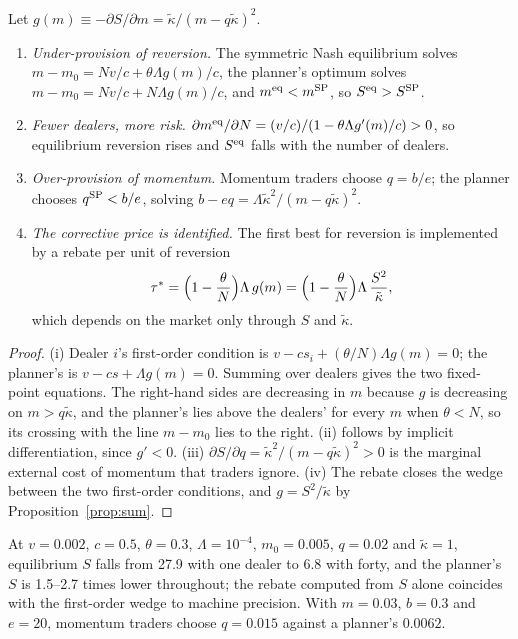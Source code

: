 \begin{proposition}\label{prop:equil}
Let $g(m)\equiv-\partial S/\partial m=\tilde\kappa/(m-q\tilde\kappa)^2$.
\begin{enumerate}[label=(\roman*)]
\item \emph{Under-provision of reversion.} The symmetric Nash equilibrium solves $m-m_0=N v/c+\theta\Lambda g(m)/c$, the planner's optimum solves $m-m_0=N v/c+N\Lambda g(m)/c$, and $m^{\rm eq}<m^{\rm SP}$, so $S^{\rm eq}>S^{\rm SP}$.
\item \emph{Fewer dealers, more risk.} $\partial m^{\rm eq}/\partial N=(v/c)/(1-\theta\Lambda g'(m)/c)>0$, so equilibrium reversion rises and $S^{\rm eq}$ falls with the number of dealers.
\item \emph{Over-provision of momentum.} Momentum traders choose $q=b/e$; the planner chooses $q^{\rm SP}<b/e$, solving $b-eq=\Lambda\tilde\kappa^2/(m-q\tilde\kappa)^2$.
\item \emph{The corrective price is identified.} The first best for reversion is implemented by a rebate per unit of reversion
\[
\tau^*=\Bigl(1-\frac\theta N\Bigr)\Lambda\,g(m)=\Bigl(1-\frac\theta N\Bigr)\Lambda\,\frac{S^2}{\tilde\kappa},
\]
which depends on the market only through $S$ and $\tilde\kappa$.
\end{enumerate}
\end{proposition}

\begin{proof}
(i) Dealer $i$'s first-order condition is $v-cs_i+(\theta/N)\Lambda g(m)=0$; the planner's is $v-cs+\Lambda g(m)=0$. Summing over dealers gives the two fixed-point equations. The right-hand sides are decreasing in $m$ because $g$ is decreasing on $m>q\tilde\kappa$, and the planner's lies above the dealers' for every $m$ when $\theta<N$, so its crossing with the line $m-m_0$ lies to the right. (ii) follows by implicit differentiation, since $g'<0$. (iii) $\partial S/\partial q=\tilde\kappa^2/(m-q\tilde\kappa)^2>0$ is the marginal external cost of momentum that traders ignore. (iv) The rebate closes the wedge between the two first-order conditions, and $g=S^2/\tilde\kappa$ by Proposition~\ref{prop:sum}.
\end{proof}

At $v=0.002$, $c=0.5$, $\theta=0.3$, $\Lambda=10^{-4}$, $m_0=0.005$, $q=0.02$ and $\tilde\kappa=1$, equilibrium $S$ falls from 27.9 with one dealer to 6.8 with forty, and the planner's $S$ is 1.5--2.7 times lower throughout; the rebate computed from $S$ alone coincides with the first-order wedge to machine precision. With $m=0.03$, $b=0.3$ and $e=20$, momentum traders choose $q=0.015$ against a planner's $0.0062$.

